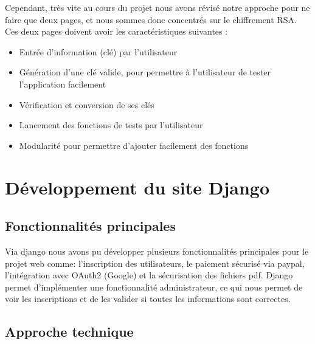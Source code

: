 \documentclass[12pt]{article} %
\begin{document}
	
	Cependant, très vite au cours du projet nous avons révisé notre approche pour ne faire que deux pages, et nous sommes donc concentrés sur le chiffrement RSA. Ces deux pages doivent avoir les caractéristiques suivantes : 

	\begin{itemize}
		\item Entrée d’information (clé) par l’utilisateur
		\item Génération d’une clé valide, pour permettre à l'utilisateur de tester l’application facilement
		\item Vérification et conversion de ses clés
		\item Lancement des fonctions de tests par l’utilisateur
		\item Modularité pour permettre d'ajouter facilement des fonctions
	\end{itemize}


\section{Développement du site Django}
	\subsection{Fonctionnalités principales}
        Via django nous avons pu développer plusieurs fonctionnalités principales pour le projet web comme: l'inscription des utilisateurs, le paiement sécurisé via paypal, l'intégration avec OAuth2 (Google) et la sécurisation des fichiers pdf. Django permet d'implémenter une fonctionnalité administrateur, ce qui nous permet de voir les inscriptions et de les valider si toutes les informations sont correctes.


	\subsection{Approche technique}
\end{document}
